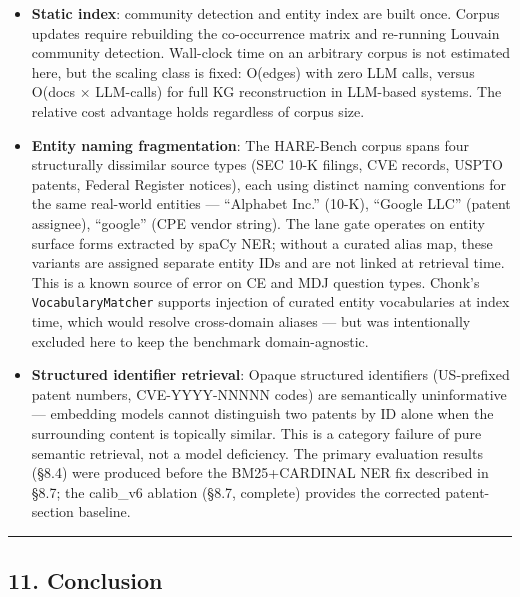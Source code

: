 \documentclass[
]{article}
\begin{document}
\begin{itemize}
  any single fixed-prompt benchmark. Our cross-model comparisons (Mini
  vs Haiku vs Sonnet) should be interpreted as lower bounds on each
  model's potential, not ceilings.
\item
  \textbf{Static index}: community detection and entity index are built
  once. Corpus updates require rebuilding the co-occurrence matrix and
  re-running Louvain community detection. Wall-clock time on an
  arbitrary corpus is not estimated here, but the scaling class is
  fixed: O(edges) with zero LLM calls, versus O(docs × LLM-calls) for
  full KG reconstruction in LLM-based systems. The relative cost
  advantage holds regardless of corpus size.
\item
  \textbf{Entity naming fragmentation}: The HARE-Bench corpus spans four
  structurally dissimilar source types (SEC 10-K filings, CVE records,
  USPTO patents, Federal Register notices), each using distinct naming
  conventions for the same real-world entities --- ``Alphabet Inc.''
  (10-K), ``Google LLC'' (patent assignee), ``google'' (CPE vendor
  string). The lane gate operates on entity surface forms extracted by
  spaCy NER; without a curated alias map, these variants are assigned
  separate entity IDs and are not linked at retrieval time. This is a
  known source of error on CE and MDJ question types. Chonk's
  \texttt{VocabularyMatcher} supports injection of curated entity
  vocabularies at index time, which would resolve cross-domain aliases
  --- but was intentionally excluded here to keep the benchmark
  domain-agnostic.
\item
  \textbf{Structured identifier retrieval}: Opaque structured
  identifiers (US-prefixed patent numbers, CVE-YYYY-NNNNN codes) are
  semantically uninformative --- embedding models cannot distinguish two
  patents by ID alone when the surrounding content is topically similar.
  This is a category failure of pure semantic retrieval, not a model
  deficiency. The primary evaluation results (§8.4) were produced before
  the BM25+CARDINAL NER fix described in §8.7; the calib\_v6 ablation
  (§8.7, complete) provides the corrected patent-section baseline.
\end{itemize}

\begin{center}\rule{0.5\linewidth}{0.5pt}\end{center}

\subsection{11. Conclusion}\label{conclusion}
\end{document}
